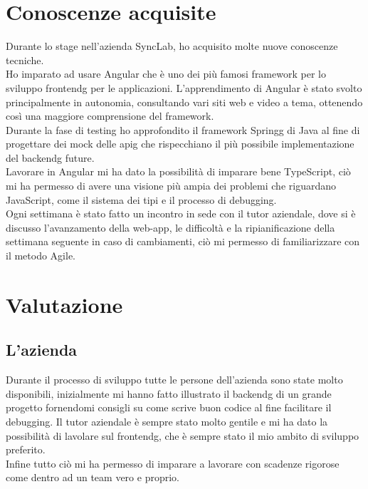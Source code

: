 \section{Conoscenze acquisite}
Durante lo stage nell'azienda SyncLab, ho acquisito molte nuove conoscenze tecniche.\\
Ho imparato ad usare Angular che è uno dei più famosi framework per lo sviluppo \gls{frontendg} per le applicazioni. L'apprendimento di Angular è stato svolto principalmente in autonomia, consultando vari siti web e video a tema, ottenendo così una maggiore comprensione del framework.\\
Durante la fase di testing ho approfondito il framework \gls{Springg} di Java al fine di progettare dei mock delle \gls{apig} che rispecchiano il più possibile implementazione del \gls{backendg} future.\\
Lavorare in Angular mi ha dato la possibilità di imparare bene TypeScript, ciò mi ha permesso di avere una visione più ampia dei problemi che riguardano JavaScript, come il sistema dei tipi e il processo di debugging.\\
Ogni settimana è stato fatto un incontro in sede con il tutor aziendale, dove si è discusso l'avanzamento della web-app, le difficoltà e la ripianificazione della settimana seguente in caso di cambiamenti, ciò mi permesso di familiarizzare con il metodo Agile.\\

\section{Valutazione}
\subsection{L'azienda}
Durante il processo di sviluppo tutte le persone dell'azienda sono state molto disponibili, inizialmente mi hanno fatto illustrato il \gls{backendg} di un grande progetto fornendomi consigli su come scrive buon codice al fine facilitare il debugging. Il tutor aziendale è sempre stato molto gentile e mi ha dato la possibilità di lavolare sul \gls{frontendg}, che è sempre stato il mio ambito di sviluppo preferito.\\
Infine tutto ciò mi ha permesso di imparare a lavorare con scadenze rigorose come dentro ad un team vero e proprio.\\
